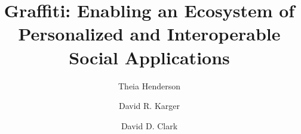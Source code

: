 \documentclass[sigconf]{acmart}
\title{Graffiti: Enabling an Ecosystem of Personalized and Interoperable Social Applications}
\author{Theia Henderson}
\affiliation{
  \institution{CSAIL, MIT}
  \city{Cambridge}
  \country{USA}
}
\author{David R. Karger}
\affiliation{
  \institution{CSAIL, MIT}
  \city{Cambridge}
  \country{USA}
}
\author{David D. Clark}
\affiliation{
  \institution{CSAIL, MIT}
  \city{Cambridge}
  \country{USA}
}
\begin{document}
\begin{abstract}

\end{abstract}
\maketitle











\clearpage
\appendix

\end{document}
